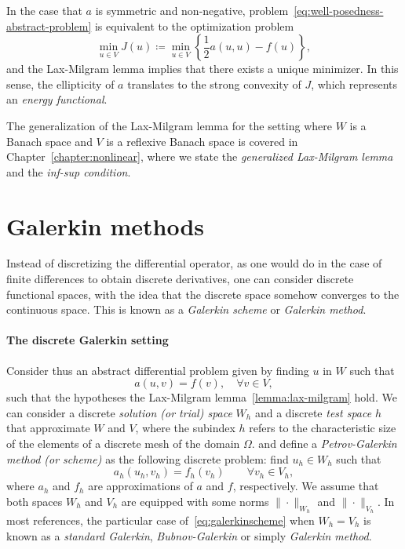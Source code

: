 In the case that $a$ is symmetric and non-negative, problem~\ref{eq:well-posedness-abstract-problem} is equivalent to the optimization problem 
\begin{equation*}
    \min_{u\in V} J(u) \coloneqq \min_{u\in V} \left\{\frac{1}{2}a(u,u) - f(u)\right\},
\end{equation*}
and the Lax-Milgram lemma implies that there exists a unique minimizer. In this sense, the ellipticity of $a$ translates to the strong convexity of $J$, which represents an \emph{energy functional}. 

The generalization of the Lax-Milgram lemma for the setting where $W$ is a Banach space and $V$ is a reflexive Banach space is covered in Chapter~\ref{chapter:nonlinear}, where we state the \emph{generalized Lax-Milgram lemma} and the \emph{inf-sup condition}. 

\section{Galerkin methods}\label{sec:galerkin}
Instead of discretizing the differential operator, as one would do in the case of finite differences to obtain discrete derivatives, one can consider discrete functional spaces, with the idea that the discrete space somehow converges to the continuous space. This is known as a \emph{Galerkin scheme} or \emph{Galerkin method}.

\paragraph{The discrete Galerkin setting}
Consider thus an abstract differential problem given by finding $u$ in $W$ such that
\begin{equation}
    a(u, v) = f(v), \quad \forall v \in V,
\end{equation}
such that the hypotheses the Lax-Milgram lemma~\ref{lemma:lax-milgram} hold. We can consider a discrete \emph{solution (or trial) space} $W_h$ and a discrete \emph{test space} $h$ that approximate $W$ and $V$, where the subindex $h$ refers to the characteristic size of the elements of a discrete mesh of the domain $\Omega$. and define a \emph{Petrov-Galerkin method (or scheme)} as the following discrete problem: find $u_h \in W_h$ such that 
\begin{equation}\label{eq:galerkinscheme}
    a_h(u_h, v_h) = f_h(v_h) \qquad \forall v_h \in V_h,
\end{equation}
where $a_h$ and $f_h$ are approximations of $a$ and $f$, respectively. 
We assume that both spaces $W_h$ and $V_h$ are equipped with some norms $\|\cdot\|_{W_h}$ and $\|\cdot\|_{V_h}$. In most references, the particular case of~\ref{eq:galerkinscheme} when $W_h = V_h$ is known as a \emph{standard Galerkin}, \emph{Bubnov-Galerkin} or simply \emph{Galerkin method}. 

